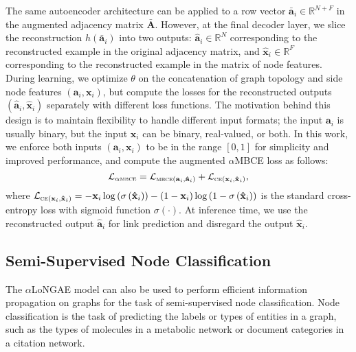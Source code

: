\documentclass[letterpaper, conference]{IEEEtran}
\begin{document}
The same autoencoder architecture can be applied to a row vector $\mathbf{\bar{a}}_i \in \mathbb{R}^{N+F}$ in the augmented adjacency matrix $\mathbf{\bar{A}}$. However, at the final decoder layer, we slice the reconstruction $h(\mathbf{\bar{a}}_i)$ into two outputs: $\mathbf{\hat{a}}_i \in \mathbb{R}^N$ corresponding to the reconstructed example in the original adjacency matrix, and $\mathbf{\hat{x}}_i \in \mathbb{R}^F$ corresponding to the reconstructed example in the matrix of node features. During learning, we optimize $\theta$ on the concatenation of graph topology and side node features $(\mathbf{a}_i, \mathbf{x}_i)$, but compute the losses for the reconstructed outputs $(\mathbf{\hat{a}}_i, \mathbf{\hat{x}}_i)$ separately with different loss functions. The motivation behind this design is to maintain flexibility to handle different input formats; the input $\mathbf{a}_i$ is usually binary, but the input $\mathbf{x}_i$ can be binary, real-valued, or both. In this work, we enforce both inputs $(\mathbf{a}_i, \mathbf{x}_i)$ to be in the range $[0, 1]$ for simplicity and improved performance, and compute the augmented $\alpha$MBCE loss as follows:
\begin{equation*}
\mathcal{L}_{\alpha \textsc{mbce}} = \mathcal{L}_{\textsc{mbce}(\mathbf{a}_i, \mathbf{\hat{a}}_i)} + \mathcal{L}_{\textsc{ce}(\mathbf{x}_i, \mathbf{\hat{x}}_i)},
\end{equation*}
where $\mathcal{L}_{\textsc{ce}(\mathbf{x}_i, \mathbf{\hat{x}}_i)} = -\mathbf{x}_i \log\left(\sigma\left(\mathbf{\hat{x}}_i\right)\right) - (1 - \mathbf{x}_i) \log\left(1 - \sigma\left(\mathbf{\hat{x}}_i\right)\right)$ is the standard cross-entropy loss with sigmoid function $\sigma(\cdot)$. At inference time, we use the reconstructed output $\mathbf{\hat{a}}_i$ for link prediction and disregard the output $\mathbf{\hat{x}}_i$.

\subsection{Semi-Supervised Node Classification}

The $\alpha$LoNGAE model can also be used to perform efficient information propagation on graphs for the task of semi-supervised node classification. Node classification is the task of predicting the labels or types of entities in a graph, such as the types of molecules in a metabolic network or document categories in a citation network.
\end{document}
